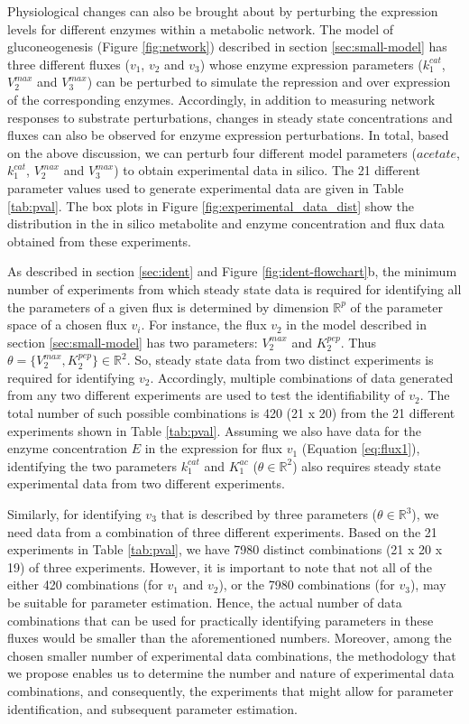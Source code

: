 \documentclass[10pt]{article}
\begin{document}
Physiological changes can also be brought about by perturbing the expression levels for different enzymes within a metabolic network. The model of gluconeogenesis (Figure \ref{fig:network}) described in section \ref{sec:small-model} has three different fluxes ($v_1$, $v_2$ and $v_3$) whose enzyme expression parameters ($k_1^{cat}$, $V_2^{max}$ and $V_3^{max}$) can be perturbed to simulate the repression and over expression of the corresponding enzymes. Accordingly, in addition to measuring network responses to substrate perturbations, changes in steady state concentrations and fluxes can also be observed for enzyme expression perturbations. In total, based on the above discussion, we can perturb four different model parameters ($acetate$, $k_1^{cat}$, $V_2^{max}$ and $V_3^{max}$) to obtain experimental data in silico. The 21 different parameter values used to generate experimental data are given in Table \ref{tab:pval}. The box plots in Figure \ref{fig:experimental_data_dist} show the distribution in the in silico metabolite and enzyme concentration and flux data obtained from these experiments.

As described in section \ref{sec:ident} and Figure \ref{fig:ident-flowchart}b, the minimum number of experiments from which steady state data is required for identifying all the parameters of a given flux is determined by dimension $\mathbb{R}^p$ of the parameter space of a chosen flux $v_i$. For instance, the flux $v_2$ in the model described in section \ref{sec:small-model} has two parameters: $V_2^{max}$ and $K_2^{pep}$. Thus $\theta = \{V_2^{max}, K_2^{pep}\} \in \mathbb{R}^2$. So, steady state data from two distinct experiments is required for identifying $v_2$. Accordingly, multiple combinations of data generated from any two different experiments are used to test the identifiability of $v_2$. The total number of such possible combinations is 420 (21 x 20) from the 21 different experiments shown in Table \ref{tab:pval}. Assuming we also have data for the enzyme concentration $E$ in the expression for flux $v_1$ (Equation \ref{eq:flux1}), identifying the two parameters $k_1^{cat}$ and $K_1^{ac}$ ($\theta \in \mathbb{R}^2$) also requires steady state experimental data from two different experiments.

Similarly, for identifying $v_3$ that is described by three parameters ($\theta \in \mathbb{R}^3$), we need data from a combination of three different experiments. Based on the 21 experiments in Table \ref{tab:pval}, we have 7980 distinct combinations (21 x 20 x 19) of three experiments. However, it is important to note that not all of the either 420 combinations (for $v_1$ and $v_2$), or the 7980 combinations (for $v_3$), may be suitable for parameter estimation. Hence, the actual number of data combinations that can be used for practically identifying parameters in these fluxes would be smaller than the aforementioned numbers. Moreover, among the chosen smaller number of experimental data combinations, the methodology that we propose enables us to determine the number and nature of experimental data combinations, and consequently, the experiments that might allow for parameter identification, and subsequent parameter estimation.

\printbibliography
\end{document}
